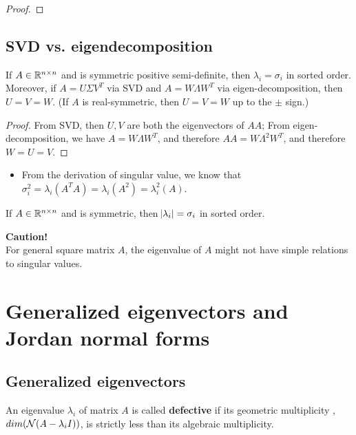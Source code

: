 \begin{refsection}
\begin{proof}
\end{proof}



\subsection{SVD  vs. eigendecomposition}



\begin{lemma}
If $A \in \mathbb{R}^{n\times n}$ and is symmetric positive semi-definite, then $\lambda_i = \sigma_i$ in sorted order. Moreover, if $A = U\Sigma V^T$ via SVD and $A = W\Lambda W^T$ via eigen-decomposition, then $U=V=W$. (If $A$ is real-symmetric, then $U=V=W$ up to the $\pm$ sign.)
\end{lemma}
\begin{proof}
From SVD, then $U,V$ are both the eigenvectors of $AA$; From eigen-decomposition, we have $A = W\Lambda W^T$, and therefore $AA = W\Lambda^2W^T$, and therefore $W = U = V$.
\end{proof}


\begin{itemize}
\item From the derivation of singular value, we know that $\sigma_i^2 = \lambda_i(A^TA) = \lambda_i (A^2) = \lambda_i^2(A)$.
\end{itemize}



\begin{corollary}
If $A \in \mathbb{R}^{n\times n}$ and is symmetric, then $\abs{\lambda_i} = \sigma_i$ in sorted order.
\end{corollary}


\begin{mdframed}
\textbf{Caution!}\\
For general square matrix $A$, the eigenvalue of $A$ might not have simple relations to singular values. 
\end{mdframed}


\section{Generalized eigenvectors and Jordan normal forms}
\subsection{Generalized eigenvectors}
\begin{definition}
	An eigenvalue $\lambda_i$ of matrix $A$ is called \textbf{defective} if its geometric multiplicity ,$dim(\mathcal{N}(A-\lambda_i I))$, is strictly less than its algebraic multiplicity.  
\end{definition}


\end{refsection}
